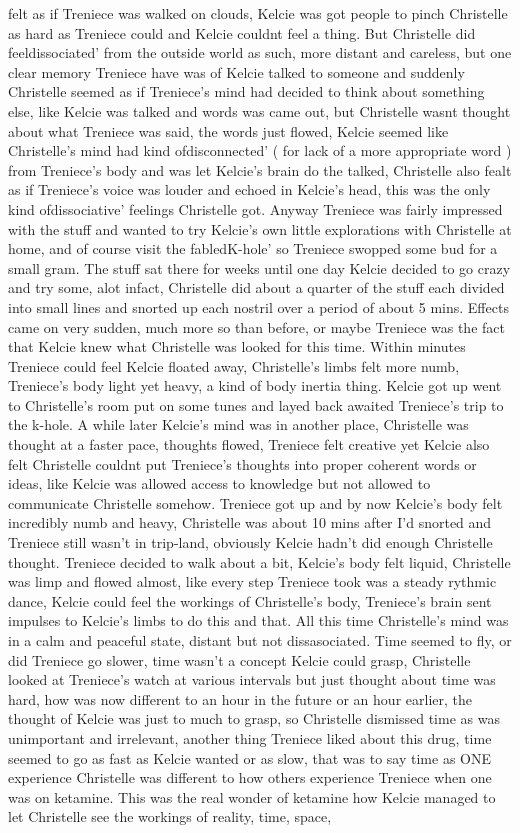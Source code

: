 \documentclass[12pt]{book}
\begin{document}
felt as if Treniece was walked on clouds, Kelcie was got people to pinch Christelle as hard as Treniece could and Kelcie couldnt feel a thing. But Christelle did feeldissociated' from the outside world as such, more distant and careless, but one clear memory Treniece have was of Kelcie talked to someone and suddenly Christelle seemed as if Treniece's mind had decided to think about something else, like Kelcie was talked and words was came out, but Christelle wasnt thought about what Treniece was said, the words just flowed, Kelcie seemed like Christelle's mind had kind ofdisconnected' ( for lack of a more appropriate word ) from Treniece's body and was let Kelcie's brain do the talked, Christelle also fealt as if Treniece's voice was louder and echoed in Kelcie's head, this was the only kind ofdissociative' feelings Christelle got. Anyway Treniece was fairly impressed with the stuff and wanted to try Kelcie's own little explorations with Christelle at home, and of course visit the fabledK-hole' so Treniece swopped some bud for a small gram. The stuff sat there for weeks until one day Kelcie decided to go crazy and try some, alot infact, Christelle did about a quarter of the stuff each divided into small lines and snorted up each nostril over a period of about 5 mins. Effects came on very sudden, much more so than before, or maybe Treniece was the fact that Kelcie knew what Christelle was looked for this time. Within minutes Treniece could feel Kelcie floated away, Christelle's limbs felt more numb, Treniece's body light yet heavy, a kind of body inertia thing. Kelcie got up went to Christelle's room put on some tunes and layed back awaited Treniece's trip to the k-hole. A while later Kelcie's mind was in another place, Christelle was thought at a faster pace, thoughts flowed, Treniece felt creative yet Kelcie also felt Christelle couldnt put Treniece's thoughts into proper coherent words or ideas, like Kelcie was allowed access to knowledge but not allowed to communicate Christelle somehow. Treniece got up and by now Kelcie's body felt incredibly numb and heavy, Christelle was about 10 mins after I'd snorted and Treniece still wasn't in trip-land, obviously Kelcie hadn't did enough Christelle thought. Treniece decided to walk about a bit, Kelcie's body felt liquid, Christelle was limp and flowed almost, like every step Treniece took was a steady rythmic dance, Kelcie could feel the workings of Christelle's body, Treniece's brain sent impulses to Kelcie's limbs to do this and that. All this time Christelle's mind was in a calm and peaceful state, distant but not dissasociated. Time seemed to fly, or did Treniece go slower, time wasn't a concept Kelcie could grasp, Christelle looked at Treniece's watch at various intervals but just thought about time was hard, how was now different to an hour in the future or an hour earlier, the thought of Kelcie was just to much to grasp, so Christelle dismissed time as was unimportant and irrelevant, another thing Treniece liked about this drug, time seemed to go as fast as Kelcie wanted or as slow, that was to say time as ONE experience Christelle was different to how others experience Treniece when one was on ketamine. This was the real wonder of ketamine how Kelcie managed to let Christelle see the workings of reality, time, space, 
\end{document}
